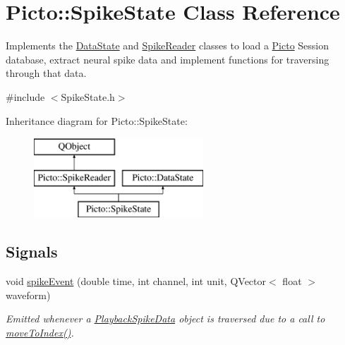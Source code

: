 \hypertarget{class_picto_1_1_spike_state}{\section{Picto\-:\-:Spike\-State Class Reference}
\label{class_picto_1_1_spike_state}
}


Implements the \hyperlink{class_picto_1_1_data_state}{Data\-State} and \hyperlink{class_picto_1_1_spike_reader}{Spike\-Reader} classes to load a \hyperlink{namespace_picto}{Picto} Session database, extract neural spike data and implement functions for traversing through that data.  




{\ttfamily \#include $<$Spike\-State.\-h$>$}

Inheritance diagram for Picto\-:\-:Spike\-State\-:\begin{figure}[H]
\begin{center}
\leavevmode
\includegraphics[height=3.000000cm]{class_picto_1_1_spike_state}
\end{center}
\end{figure}
\subsection*{Signals}
\begin{DoxyCompactItemize}
\item 
void \hyperlink{class_picto_1_1_spike_state_a87ccdb38e1f4d25fd7d74781da290e13}{spike\-Event} (double time, int channel, int unit, Q\-Vector$<$ float $>$ waveform)
\begin{DoxyCompactList}\small\item\em Emitted whenever a \hyperlink{struct_picto_1_1_playback_spike_data}{Playback\-Spike\-Data} object is traversed due to a call to \hyperlink{class_picto_1_1_spike_state_adff36be6aba208cd131b253926a18853}{move\-To\-Index()}. \end{DoxyCompactList}\end{DoxyCompactItemize}

